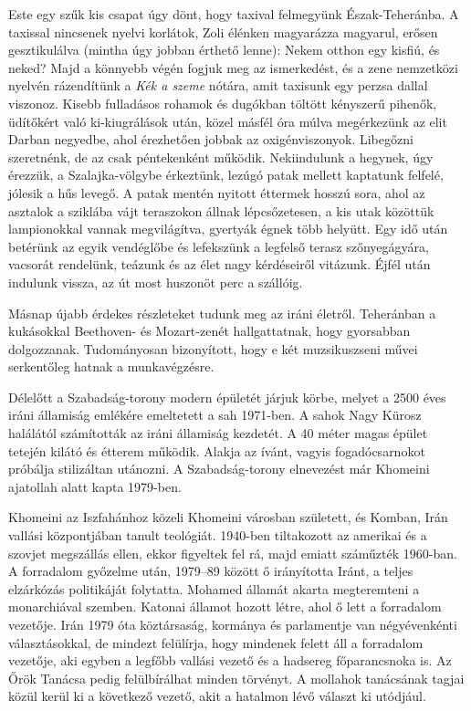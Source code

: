 Este egy szűk kis csapat úgy dönt, hogy taxival felmegyünk Észak-Teheránba.
A taxissal nincsenek nyelvi korlátok, Zoli élénken magyarázza
magyarul, erősen gesztikulálva (mintha úgy jobban érthető
lenne): Nekem otthon egy kisfiú, és neked? Majd a könnyebb végén
fogjuk meg az ismerkedést, és a zene nemzetközi nyelvén rázendítünk
a \textit{Kék a szeme} nótára, amit taxisunk egy perzsa dallal viszonoz.
Kisebb fulladásos rohamok és dugókban töltött kényszerű pihenők, üdítőkért
való ki-kiugrálások után, közel másfél óra múlva megérkezünk az elit
Darban negyedbe, ahol érezhetően jobbak az oxigénviszonyok. Libegőzni
szeretnénk, de az csak péntekenként működik. Nekiindulunk
a hegynek, úgy érezzük, a Szalajka-völgybe érkeztünk, lezúgó patak
mellett kaptatunk felfelé, jólesik a hűs levegő. A patak mentén nyitott
éttermek hosszú sora, ahol az asztalok a sziklába vájt teraszokon állnak
lépcsőzetesen, a kis utak közöttük lampionokkal vannak megvilágítva,
gyertyák égnek több helyütt. Egy idő után betérünk az egyik
vendéglőbe és lefekszünk a legfelső terasz szőnyegágyára, vacsorát rendelünk,
teázunk és az élet nagy kérdéseiről vitázunk. Éjfél után indulunk
vissza, az út most huszonöt perc a szállóig.

Másnap újabb érdekes részleteket tudunk meg az iráni életről. Teheránban
a kukásokkal Beethoven- és Mozart-zenét hallgattatnak,
hogy gyorsabban dolgozzanak. Tudományosan bizonyított, hogy e két
muzsikuszseni művei serkentőleg hatnak a munkavégzésre.

Délelőtt a Szabadság-torony modern épületét járjuk körbe, melyet
a 2500 éves iráni államiság emlékére emeltetett a sah 1971-ben.
A sahok Nagy Kürosz halálától számították az iráni államiság kezdetét.
A 40 méter magas épület tetején kilátó és étterem működik.
Alakja az ívánt, vagyis fogadócsarnokot próbálja stilizáltan utánozni.
A Szabadság-torony elnevezést már Khomeini ajatollah alatt
kapta 1979-ben.

Khomeini az Iszfahánhoz közeli Khomeini városban született, és
Komban, Irán vallási központjában tanult teológiát. 1940-ben tiltakozott
az amerikai és a szovjet megszállás ellen, ekkor figyeltek fel
rá, majd emiatt száműzték 1960-ban. A forradalom győzelme után,
1979--89 között ő irányította Iránt, a teljes elzárkózás politikáját
folytatta. Mohamed államát akarta megteremteni a monarchiával szemben.
Katonai államot hozott létre, ahol ő lett a forradalom vezetője.
Irán 1979 óta köztársaság, kormánya és parlamentje van négyévenkénti
választásokkal, de mindezt felülírja, hogy mindenek felett áll a
forradalom vezetője, aki egyben a legfőbb vallási vezető és a hadsereg
főparancsnoka is. Az Őrök Tanácsa pedig felülbírálhat minden törvényt.
A mollahok tanácsának tagjai közül kerül ki a következő vezető,
akit a hatalmon lévő választ ki utódjául.

